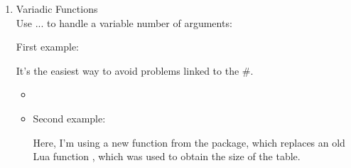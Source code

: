 \begin{enumerate}[label=(\alph*)]
The problem is the use of l'operator \% (Modulus Operator and remainder of after an integer division). The same problem occurs when using the string.format function and the \%d or \%i: placeholder for an integer.

One solution for these two cases is to define a macro  which replaces the \%.

\begin{verbatim}
 \makeatletter
 \let\pc\@percentchar
 \makeatother
\end{verbatim}

The code becomes :


\begin{verbatim}
\directlua{
 function divide_and_remainder(dividend, divisor)
   if divisor == 0 then
     tex.error("Error: Cannot divide by zero")
     return nil
   else
     local quotient = math.floor(dividend / divisor)
     local remainder = dividend \pc divisor
     return quotient, remainder
   end
 end

local num1 = 17
local num2 = 5
local q, r = divide_and_remainder(num1, num2)

tex.sprint(string.format([[The quotient of \pc i divided by
 \pc i is: \pc i\\]], num1, num2, q))
tex.sprint(string.format([[The remainder is: \pc i]], r))}
\end{verbatim}

\item Variadic Functions\\

Use ... to handle a variable number of arguments:

First example:

It's the easiest way to avoid problems linked to the \#.

\begin{itemize}


  \item   \begin{tkzexample}[latex=.2\textwidth]
  \end{tkzexample}


\item   Second example:

Here, I'm using a new function from the  package, which replaces an old Lua function , which was used to obtain the size of the table.


\end{itemize}
\end{enumerate}
